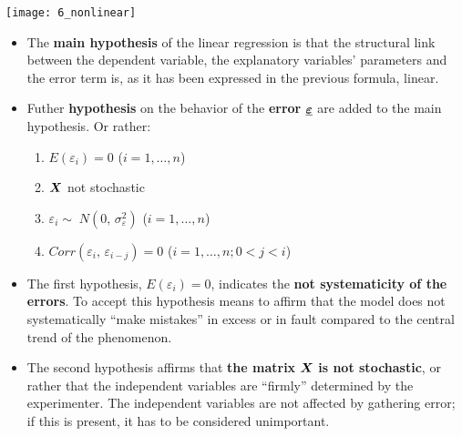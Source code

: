 \begin{frame}
  \begin{center}
    \texttt{[image: 6\_nonlinear]}
  \end{center}
\end{frame}





\begin{frame}
  \vspace*{.25cm}
  \begin{itemize}
    \item The \textbf{main hypothesis} of the linear regression is that the structural link between the dependent variable, the explanatory variables' parameters and the error term is, as it has been expressed in the previous formula, linear. 
    \vspace*{.5cm}
    \item Futher \textbf{hypothesis} on the behavior of the \textbf{error} $ \boldsymbol{\underline{\varepsilon}} $ are added to the main hypothesis. Or rather:\\
    \begin{enumerate}
     \item $ E(\varepsilon_{i}) = 0 $ \hspace{1.7cm} ($ i = 1, \dots, n $)
     \item $ \boldsymbol{X} $ not stochastic
     \item $ \varepsilon_i \sim\; N(0,\,\sigma^2_\varepsilon) $ \hspace{1cm} ($ i = 1, \dots, n $)
     \item $ Corr(\varepsilon_{i},\,\varepsilon_{i-j}) = 0 $ \hspace{0.4cm} ($ i = 1, \dots, n; 0 < j < i $)
    \end{enumerate}
  \end{itemize}
\end{frame}

\begin{frame}
  \vspace*{.5cm}
  \begin{itemize}
    \item The first hypothesis, {\boldmath$E(\varepsilon_{i})=0$}, indicates the \textbf{not systematicity of the errors}. To accept this hypothesis means to affirm that the model does not systematically ``make mistakes'' in excess or in fault compared to the central trend of the phenomenon.
    \vspace*{.5cm}
    \item The second hypothesis affirms that \textbf{the matrix} $ \boldsymbol{X} $ \textbf{is not stochastic}, or rather that the independent variables are ``firmly'' determined by the experimenter. The independent variables are not affected by gathering error; if this is present, it has to be considered unimportant. 
  \end{itemize}
\end{frame}

